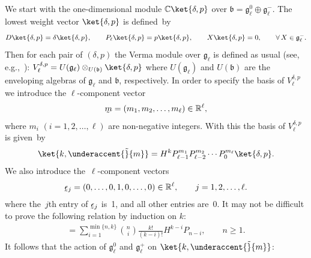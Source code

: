 We start with the one-dimensional module $ {\mathbb C} \ket{\delta,p} $ over $ {\mathfrak b} = {\mathfrak g}_{\ell}^0
\oplus {\mathfrak g}_{\ell}^-$. The lowest weight vector $ \ket{\delta,p} $ is def\/ined~by
\begin{gather*}
D \ket{\delta,p} = \delta \ket{\delta,p},
\qquad
P_{\ell} \ket{\delta,p} = p \ket{\delta,p},
\qquad
X \ket{\delta,p} = 0,
\qquad
 \forall \, X \in {\mathfrak g}_{\ell}^-.
\end{gather*}
Then for each pair of $(\delta,p) $ the Verma module over $ {\mathfrak g}_{\ell} $ is def\/ined as usual (see, e.g.,~\cite{Dix}): $ V^{\delta,p}_{\ell} = U({\mathfrak g}_{\ell}) \otimes_{U({\mathfrak b})} \ket{\delta,p} $ where $U({\mathfrak g}_{\ell})$ and $ U({\mathfrak b}) $ are the enveloping algebras of $ {\mathfrak g}_{\ell} $ and $
\mathfrak b$, respectively.
In order to specify the basis of $ V^{\delta,p}_{\ell} $ we introduce the $ \ell$-component vector
\begin{gather*}
\underaccent{\tilde}{m} = (m_1, m_2, \dots, m_{\ell})  \in {\mathbb R}^{\ell},
\end{gather*}
where $ m_i$ $(i=1,2,\dots,\ell) $ are non-negative integers.
With this the basis of $ V^{\delta,p}_{\ell} $ is given~by
\begin{gather}
\ket{k,\underaccent{\tilde}{m}} = H^k P_{\ell-1}^{m_1} P_{\ell-2}^{m_2} \cdots P_0^{m_{\ell}} \ket{\delta,p}.
\label{anyl-basis}
\end{gather}
We also introduce the~$\ell$-component vectors
\begin{gather*}
\underaccent{\tilde}{\epsilon}_j = (0, \dots, 0, 1, 0, \dots,0) \in {\mathbb R}^{\ell},
\qquad
j=1,2,\dots, \ell.
\end{gather*}
where the~$j$th entry of $\underaccent{\tilde}{\epsilon}_j $ is~1, and all other entries are~0.
It may not be dif\/f\/icult to prove the following relation by induction on $k$:
\begin{gather}
[P_n, H^k] = \sum\limits_{i=1}^{\min\{n,k\}} \binom{n}{i} \frac{k!}{(k-i)!}  H^{k-i}   P_{n-i},
\qquad
n \geq 1.
\label{PnHkcomm}
\end{gather}
It follows that the action of $ {\mathfrak g}_{\ell}^0$ and ${\mathfrak g}_{\ell}^+$ on $\ket{k,\underaccent{\tilde}{m}}$:
